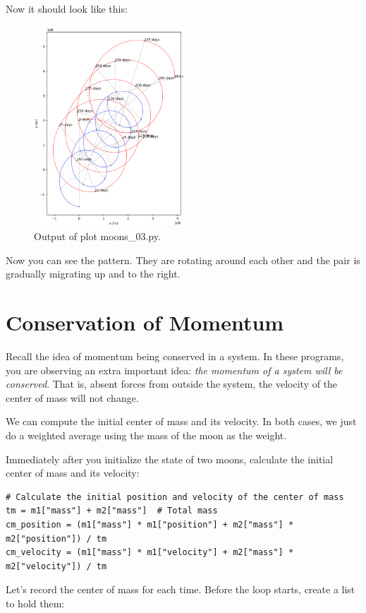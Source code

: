 Now it should look like this:
\begin{figure}[htbp]
    \centering
    \includegraphics[width=0.5\textwidth]{plotmoons_03.png}
    \caption{Output of plot moons\_03.py.}
\end{figure}

Now you can see the pattern. They are rotating around each other and the pair is gradually migrating
up and to the right.

\section{Conservation of Momentum}
Recall the idea of momentum being conserved in a system. In these programs, you are observing an extra important idea: \emph{the momentum of a system will be conserved}. That is, absent forces from outside the system,  the velocity of the center of mass will not change.

We can compute the initial center of mass and its velocity.   In both cases,  we just do a weighted average using the mass of the moon as the weight. 

Immediately after you initialize the state of two moons,  calculate the initial center of mass and its velocity:
\begin{verbatim}
# Calculate the initial position and velocity of the center of mass
tm = m1["mass"] + m2["mass"]  # Total mass
cm_position = (m1["mass"] * m1["position"] + m2["mass"] * m2["position"]) / tm
cm_velocity = (m1["mass"] * m1["velocity"] + m2["mass"] * m2["velocity"]) / tm
\end{verbatim}

Let's record the center of mass for each time.   Before the loop starts,  create a list to hold them:

